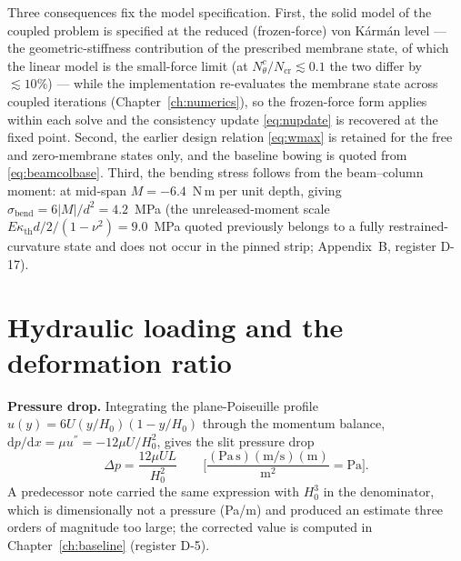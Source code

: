 Three consequences fix the model specification. First, the solid model of the coupled problem is
specified at the reduced (frozen-force) von K\'arm\'an level --- the geometric-stiffness
contribution of the prescribed membrane state, of which the linear model is the small-force
limit (at $N_\theta^c/N_{\mathrm{cr}}\lesssim0.1$ the two differ by $\lesssim10\%$) --- while
the implementation re-evaluates the membrane state across coupled iterations
(Chapter~\ref{ch:numerics}), so the frozen-force form applies within each solve and the
consistency update \eqref{eq:nupdate} is recovered at the fixed point. Second, the earlier
design relation \eqref{eq:wmax} is retained for the free and zero-membrane states only, and the
baseline bowing is quoted from \eqref{eq:beamcolbase}. Third, the bending stress follows from
the beam--column moment: at mid-span $M=-6.4$~N\,m per unit depth, giving
$\sigma_{\mathrm{bend}}=6|M|/d^2=4.2$~MPa (the unreleased-moment scale $E\kappa_{\mathrm{th}}d/2
/(1-\nu^2)=9.0$~MPa quoted previously belongs to a fully restrained-curvature state and does not
occur in the pinned strip; Appendix~B, register D-17).

\section{Hydraulic loading and the deformation ratio}
\label{sec:deriv:pressure}
\textbf{Pressure drop.} Integrating the plane-Poiseuille profile
$u(y)=6U(y/H_0)(1-y/H_0)$ \cite{bird1960transport,shah1978laminar} through the momentum balance,
$\mathrm dp/\mathrm dx=\mu u^{''}=-12\mu U/H_0^2$, gives the slit pressure drop
\begin{equation}
\Delta p=\frac{12\mu UL}{H_0^2}
\qquad
\Big[\frac{(\mathrm{Pa\,s})(\mathrm{m/s})(\mathrm m)}{\mathrm{m^2}}=\mathrm{Pa}\Big] .
\label{eq:dp}
\end{equation}
A predecessor note carried the same expression with $H_0^3$ in the denominator, which is
dimensionally not a pressure (Pa/m) and produced an estimate three orders of magnitude too large;
the corrected value is computed in Chapter~\ref{ch:baseline} (register D-5).

